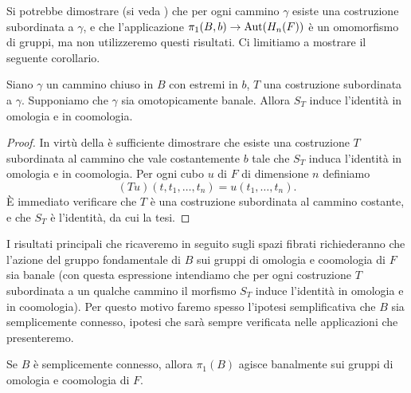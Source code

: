Si potrebbe dimostrare (si veda ) che per ogni cammino $\gamma$ esiste una costruzione subordinata a $\gamma$, e che l'applicazione $\pi_1(B,b)\to\operatorname{Aut}(H_n(F))$ è un omomorfismo di gruppi, ma non utilizzeremo questi risultati.
Ci limitiamo a mostrare il seguente corollario.
\begin{corollary}
Siano $\gamma$ un cammino chiuso in $B$ con estremi in $b$, $T$ una costruzione subordinata a $\gamma$. Supponiamo che $\gamma$ sia omotopicamente banale. Allora $S_T$ induce l'identità in omologia e in coomologia.
\end{corollary}
\begin{proof}
In virtù della  è sufficiente dimostrare che esiste una costruzione $T$ subordinata al cammino che vale costantemente $b$ tale che $S_T$ induca l'identità in omologia e in coomologia. Per ogni cubo $u$ di $F$ di dimensione $n$ definiamo
$$
(Tu)(t,t_1,\ldots,t_n)=u(t_1,\ldots,t_n).
$$
È immediato verificare che $T$ è una costruzione subordinata al cammino costante, e che $S_T$ è l'identità, da cui la tesi.
\end{proof}

I risultati principali che ricaveremo in seguito sugli spazi fibrati richiederanno che l'azione del gruppo fondamentale di $B$ sui gruppi di omologia e coomologia di $F$ sia banale (con questa espressione intendiamo che per ogni costruzione $T$ subordinata a un qualche cammino il morfismo $S_T$ induce l'identità in omologia e in coomologia). Per questo motivo faremo spesso l'ipotesi semplificativa che $B$ sia semplicemente connesso, ipotesi che sarà sempre verificata nelle applicazioni che presenteremo.

\begin{corollary}
Se $B$ è semplicemente connesso, allora $\pi_1(B)$ agisce banalmente sui gruppi di omologia e coomologia di $F$.
\end{corollary}

